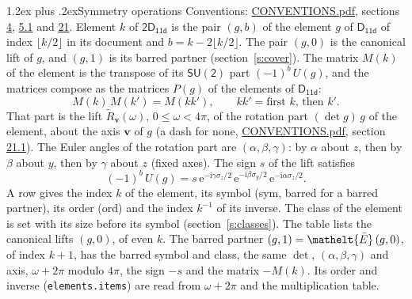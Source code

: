 \documentclass[10pt,a4paper]{article}
\makeatletter
\renewcommand\section{\@startsection{section}{1}{\z@}{-3ex plus -1ex minus -.2ex}%
  {1.2ex plus .2ex}{\normalfont\large\sffamily\bfseries\color{parttitle}}}
\numberwithin{equation}{section}
\newcommand{\eltfont}[1]{{\let\sigma\eltsigma\mathelt{#1}}}
\newcommand{\grp}[1]{\mathsf{#1}}
\newcommand{\elt}[1]{\eltfont{#1}}
\newcommand{\vv}{\mathbf{v}}
\newcommand{\iunit}{\mathrm{i}}
\newcommand{\expe}{\mathrm{e}}
\newcommand{\barred}[1]{\bar{#1}}
\newcommand{\lift}[1]{\tilde{#1}}
\newcommand{\pauli}[1]{\sigma_{#1}}
\makeatother
\begin{document}
\section{Symmetry operations}\label{s:elements}
Conventions: \href{../../CONVENTIONS.pdf}{CONVENTIONS.pdf}, sections \href{../../../rotation/CONVENTIONS.pdf\#conv.4}{4}, \href{../../../rotation/CONVENTIONS.pdf\#conv.5.1}{5.1} and \href{../../CONVENTIONS.pdf\#conv.21}{21}.
\leavevmode\label{n:index.element}\label{n:element.g}Element $k$ of $\grp{2D_{11d}}$ is the pair $(g, b)$ of the element $g$ of \href{../../../rotation/data/pdf/D11d.pdf}{$\grp{D_{11d}}$} of index $\lfloor k/2\rfloor$ in its document and $b = k - 2\lfloor k/2\rfloor$. The pair $(g, 0)$ is the canonical lift of $g$, and $(g, 1)$ is its barred partner (section~\ref{s:cover}). \label{n:matrix.element.pin}\label{n:matrix.element}The matrix $M(k)$ of the element is the transpose of its $\grp{SU(2)}$ part $(-1)^{b}\,U(g)$, and the matrices compose as the matrices $P(g)$ of the elements of $\grp{D_{11d}}$:
\begin{equation}\label{e:mprod}M(k)\,M(k') = M(kk'),\qquad kk' = \text{first } k\text{, then } k'.\end{equation}
\leavevmode\label{n:angle.omega}\label{n:vector.axis}\label{n:vector.pole}That part is the lift $\lift{R}_{\vv}(\omega)$, $0 \le \omega < 4\pi$, of the rotation part $(\det g)\,g$ of the element, about the axis $\vv$ of $g$ (a dash for none, \href{../../CONVENTIONS.pdf}{CONVENTIONS.pdf}, section \href{../../CONVENTIONS.pdf\#conv.21.1}{21.1}). \label{n:angle.euler.alpha}\label{n:angle.euler.beta}\label{n:angle.euler.gamma}\label{n:vector.coordinates}The Euler angles of the rotation part are $(\alpha,\beta,\gamma)$: by $\alpha$ about $z$, then by $\beta$ about $y$, then by $\gamma$ about $z$ (fixed axes). \label{n:local.euler.sign}The sign $s$ of the lift satisfies
\begin{equation}\label{e:euler}(-1)^{b}\,U(g) = s\,\expe^{-\iunit\gamma\pauli{z}/2}\,\expe^{-\iunit\beta\pauli{y}/2}\,\expe^{-\iunit\alpha\pauli{z}/2}.\end{equation}
\leavevmode\label{n:index.element.inverse}\label{n:head.sym}\label{n:head.ord}A row gives the index $k$ of the element, its symbol (sym, barred for a barred partner), its order (ord) and the index $k^{-1}$ of its inverse. \label{n:head.class}The class of the element is set with its size before its symbol (section~\ref{s:classes}).
The table lists the canonical lifts $(g, 0)$, of even $k$. The barred partner $(g, 1) = \elt{\barred{E}}\,(g, 0)$, of index $k + 1$, has the barred symbol and class, the same $\det$, $(\alpha,\beta,\gamma)$ and axis, $\omega + 2\pi$ modulo $4\pi$, the sign $-s$ and the matrix $-M(k)$. Its order and inverse (\texttt{elements.items}) are read from $\omega + 2\pi$ and the multiplication table.
\end{document}
